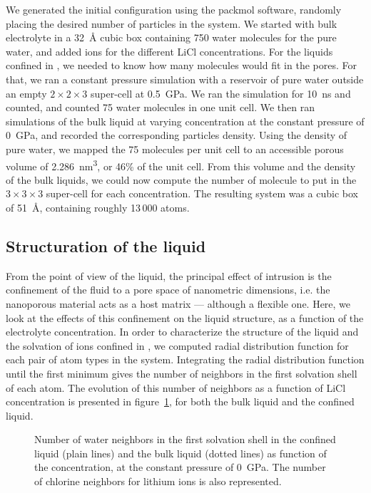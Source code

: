 \documentclass[thesis]{subfiles}
\begin{document}
We generated the initial configuration using the packmol
software\cite{Martnez2009}, randomly placing the desired number of particles in
the system. We started with bulk electrolyte in a \SI{32}{\angstrom} cubic box
containing 750 water molecules for the pure water, and added ions for the
different LiCl concentrations. For the liquids confined in , we needed to
know how many molecules would fit in the  pores. For that, we ran a
constant pressure simulation with a reservoir of pure water outside an empty
$2\times2\times3$  super-cell at \SI{0.5}{GPa}. We ran the simulation for
\SI{10}{ns} and counted, and counted 75 water molecules in one unit cell. We
then ran simulations of the bulk liquid at varying concentration at the constant
pressure of \SI{0}{GPa}, and recorded the corresponding particles density. Using
the density of pure water, we mapped the 75 molecules per unit cell to an
accessible porous volume of \SI{2.286}{nm^3}, or {46\%} of the unit cell. From
this volume and the density of the bulk liquids, we could now compute the number
of molecule to put in the $3\times3\times3$ super-cell for each concentration.
The resulting system was a cubic box of \SI{51}{\angstrom}, containing roughly
13\,000 atoms.

\subsection{Structuration of the liquid}
\label{sec:liquid-structure}

From the point of view of the liquid, the principal effect of intrusion is the
confinement of the fluid to a pore space of nanometric dimensions, i.e. the
nanoporous material acts as a host matrix --- although a flexible one. Here, we
look at the effects of this confinement on the liquid structure, as a function
of the electrolyte concentration. In order to characterize the structure of the
liquid and the solvation of ions confined in , we computed radial
distribution function for each pair of atom types in the system. Integrating the
radial distribution function until the first minimum gives the number of
neighbors in the first solvation shell of each atom. The evolution of this
number of neighbors as a function of LiCl concentration is presented in
figure~\ref{fig:licl-zif:neighbors}, for both the bulk liquid and the confined
liquid.

\begin{figure}[ht]
    \centering
    
    \caption{Number of water neighbors in the first solvation shell in the
    confined liquid (plain lines) and the bulk liquid (dotted lines) as
    function of the concentration, at the constant pressure of \SI{0}{GPa}.
    The number of chlorine neighbors for lithium ions is also represented.}
    \label{fig:licl-zif:neighbors}
\end{figure}
\end{document}
